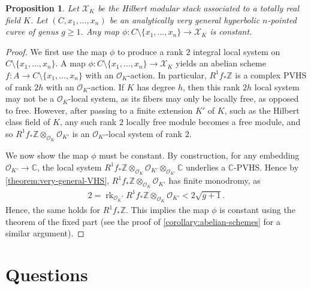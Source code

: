\documentclass[12 pt]{amsart}
\theoremstyle{plain}
\newtheorem{proposition}[subsubsection]{Proposition}
\theoremstyle{definition}
\theoremstyle{remark}
\numberwithin{equation}{section}
\DeclareMathOperator\rk{rk}
\begin{document}
\begin{proposition}
	\label{proposition:hilbert-modular}
	Let $\mathscr X_K$ be the Hilbert modular stack associated to a totally
	real field $K$.
	Let $(C, x_1, \ldots, x_n)$ be an analytically very general hyperbolic $n$-pointed
	curve of genus $g \geq 1$.
	Any map $\phi: C\setminus \{x_1, \ldots, x_n\} \to \mathscr X_K$ is constant.
\end{proposition}
\begin{proof}
	We first use the map $\phi$ to produce a rank $2$ integral local system
	on $C \setminus \{x_1, \ldots, x_n\}$.
	A map $\phi: C\setminus \{x_1, \ldots, x_n\} \to \mathscr X_K$ yields an
	abelian scheme $f: A \to C\setminus \{x_1, \ldots, x_n\}$ with an $\mathscr
	O_K$-action. In particular, $R^1 f_* \mathbb Z$ is a 
	complex PVHS of rank $2h$ with an	$\mathscr O_K$-action.
	If $K$ has degree $h$, then this rank $2h$ local system may not be a
	$\mathscr O_K$-local system, as its fibers may only be locally free, as opposed to free.
	However, after passing to a finite extension $K'$ of $K$, such as the
	Hilbert class field of $K$, any such rank $2$ locally free module
	becomes a free module,
	and so $R^1 f_* \mathbb Z
	\otimes_{\mathscr O_K} \mathscr O_{K'}$ is an $\mathscr O_{K'}$-local system of rank $2$.
	
	We now show the map $\phi$ must be constant.
	By construction,
	for any embedding $\mathscr O_{K'} \to \mathbb C$, the local system
$R^1 f_* \mathbb Z\otimes_{\mathscr O_K} \mathscr O_{K'} \otimes_{\mathscr
O_{K'}} \mathbb C$ underlies a $\mathbb{C}$-PVHS. Hence by \autoref{theorem:very-general-VHS}, $R^1 f_* \mathbb Z\otimes_{\mathscr O_K} \mathscr O_{K'}$ has finite monodromy, as 
\begin{align*}
2 = \rk_{\mathscr O_K'}R^1 f_* \mathbb Z\otimes_{\mathscr O_K} \mathscr O_{K'} < 2 \sqrt{g+1}.
\end{align*}
Hence, the same holds for
$R^1 f_* \mathbb Z$. 
This implies the map $\phi$ is constant using the theorem of the fixed part
\cite[Corollaire 4.1.2]{deligne:hodge-ii} (see the proof
of \autoref{corollary:abelian-schemes} for a similar argument).
\end{proof}





\section{Questions}\label{section:questions}
\end{document}
